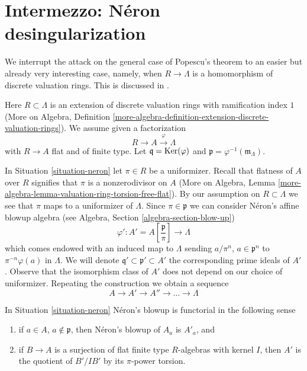 \section{Intermezzo: N\'eron desingularization}
\label{section-neron}

\noindent
We interrupt the attack on the general case of Popescu's theorem to
an easier but already very interesting case, namely, when
$R \to \Lambda$ is a homomorphism of discrete valuation rings.
This is discussed in
\cite[Section 4]{Artin-Algebraic-Approximation}.

\begin{situation}
\label{situation-neron}
Here $R \subset \Lambda$ is an extension of discrete valuation rings
with ramification index $1$ (More on Algebra, Definition
\ref{more-algebra-definition-extension-discrete-valuation-rings}).
We assume given a factorization
$$
R \to A \xrightarrow{\varphi} \Lambda
$$
with $R \to A$ flat and of finite type. Let $\mathfrak q = \mathop{\mathrm{Ker}}(\varphi)$
and $\mathfrak p = \varphi^{-1}(\mathfrak m_\Lambda)$.
\end{situation}

\noindent
In Situation \ref{situation-neron} let $\pi \in R$ be a uniformizer.
Recall that flatness of $A$ over $R$ signifies that $\pi$
is a nonzerodivisor on $A$
(More on Algebra, Lemma
\ref{more-algebra-lemma-valuation-ring-torsion-free-flat}).
By our assumption on $R \subset \Lambda$ we see that $\pi$ maps
to a uniformizer of $\Lambda$. Since $\pi \in \mathfrak p$ we can consider
N\'eron's affine blowup algebra (see
Algebra, Section \ref{algebra-section-blow-up})
$$
\varphi' :
A' = A[\textstyle{\frac{\mathfrak p}{\pi}}]
\longrightarrow
\Lambda
$$
which comes endowed with an induced map to $\Lambda$ sending
$a/\pi^n$, $a \in \mathfrak p^n$ to $\pi^{-n}\varphi(a)$ in $\Lambda$.
We will denote $\mathfrak q' \subset \mathfrak p' \subset A'$
the corresponding prime ideals of $A'$. Observe that the isomorphism
class of $A'$ does not depend on our choice of uniformizer.
Repeating the construction we obtain a sequence
$$
A \to A' \to A'' \to \ldots \to \Lambda
$$

\begin{lemma}
\label{lemma-neron-functorial}
In Situation \ref{situation-neron} N\'eron's blowup is functorial
in the following sense
\begin{enumerate}
\item if $a \in A$, $a \not \in \mathfrak p$, then N\'eron's blowup
of $A_a$ is $A'_a$, and
\item if $B \to A$ is a surjection of flat finite type $R$-algebras
with kernel $I$, then $A'$ is the quotient of $B'/IB'$ by its
$\pi$-power torsion.
\end{enumerate}
\end{lemma}

